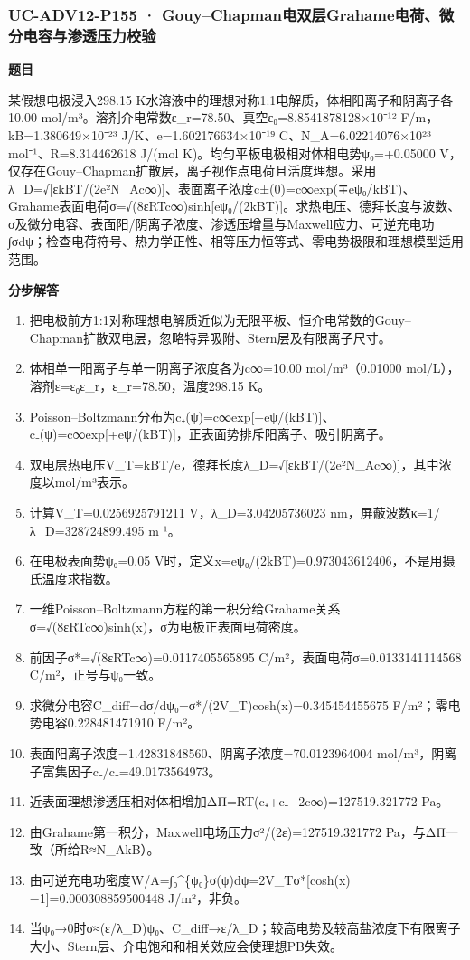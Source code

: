 \documentclass[UTF8,11pt,a4paper]{ctexart}
\begin{document}
\subsubsection*{UC-ADV12-P155 · Gouy–Chapman电双层Grahame电荷、微分电容与渗透压力校验}
\noindent\textbf{题目}\par
某假想电极浸入298.15 K水溶液中的理想对称1:1电解质，体相阳离子和阴离子各10.00 mol/m³。溶剂介电常数ε\_r=78.50、真空ε₀=8.8541878128×10⁻¹² F/m，kB=1.380649×10⁻²³ J/K、e=1.602176634×10⁻¹⁹ C、N\_A=6.02214076×10²³ mol⁻¹、R=8.314462618 J/(mol K)。均匀平板电极相对体相电势ψ₀=+0.05000 V，仅存在Gouy–Chapman扩散层，离子视作点电荷且活度理想。采用λ\_D=√[εkBT/(2e²N\_Ac∞)]、表面离子浓度c±(0)=c∞exp(∓eψ₀/kBT)、Grahame表面电荷σ=√(8εRTc∞)sinh[eψ₀/(2kBT)]。求热电压、德拜长度与波数、σ及微分电容、表面阳/阴离子浓度、渗透压增量与Maxwell应力、可逆充电功∫σdψ；检查电荷符号、热力学正性、相等压力恒等式、零电势极限和理想模型适用范围。\par
\medskip\noindent\textbf{分步解答}
\begin{enumerate}
\item 把电极前方1:1对称理想电解质近似为无限平板、恒介电常数的Gouy–Chapman扩散双电层，忽略特异吸附、Stern层及有限离子尺寸。
\item 体相单一阳离子与单一阴离子浓度各为c∞=10.00 mol/m³（0.01000 mol/L），溶剂ε=ε₀ε\_r，ε\_r=78.50，温度298.15 K。
\item Poisson–Boltzmann分布为c₊(ψ)=c∞exp[−eψ/(kBT)]、c₋(ψ)=c∞exp[+eψ/(kBT)]，正表面势排斥阳离子、吸引阴离子。
\item 双电层热电压V\_T=kBT/e，德拜长度λ\_D=√[εkBT/(2e²N\_Ac∞)]，其中浓度以mol/m³表示。
\item 计算V\_T=0.0256925791211 V，λ\_D=3.04205736023 nm，屏蔽波数κ=1/λ\_D=328724899.495 m⁻¹。
\item 在电极表面势ψ₀=0.05 V时，定义x=eψ₀/(2kBT)=0.973043612406，不是用摄氏温度求指数。
\item 一维Poisson–Boltzmann方程的第一积分给Grahame关系σ=√(8εRTc∞)sinh(x)，σ为电极正表面电荷密度。
\item 前因子σ*=√(8εRTc∞)=0.0117405565895 C/m²，表面电荷σ=0.0133141114568 C/m²，正号与ψ₀一致。
\item 求微分电容C\_diff=dσ/dψ₀=σ*/(2V\_T)cosh(x)=0.345454455675 F/m²；零电势电容0.228481471910 F/m²。
\item 表面阳离子浓度=1.42831848560、阴离子浓度=70.0123964004 mol/m³，阴离子富集因子c₋/c₊=49.0173564973。
\item 近表面理想渗透压相对体相增加ΔΠ=RT(c₊+c₋−2c∞)=127519.321772 Pa。
\item 由Grahame第一积分，Maxwell电场压力σ²/(2ε)=127519.321772 Pa，与ΔΠ一致（所给R≈N\_AkB）。
\item 由可逆充电功密度W/A=∫₀\textasciicircum{}\{ψ₀\}σ(ψ)dψ=2V\_Tσ*[cosh(x)−1]=0.000308859500448 J/m²，非负。
\item 当ψ₀→0时σ≈(ε/λ\_D)ψ₀、C\_diff→ε/λ\_D；较高电势及较高盐浓度下有限离子大小、Stern层、介电饱和和相关效应会使理想PB失效。
\end{enumerate}
\end{document}
